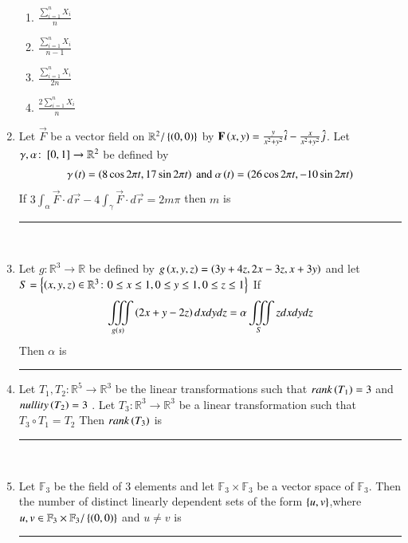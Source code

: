 \documentclass[journal,12pt,onecolumn]{IEEEtran}
\theoremstyle{remark}
\begin{document}
\begin{enumerate}
\begin{multicols}{2}
\begin{enumerate}
           \item $\frac{\sum_{i=1}^{n} X_i}{n}$\\
            \item $\frac{\sum_{i=1}^{n} X_i}{n-1}$
             \item $\frac{\sum_{i=1}^{n} X_i}{2n}$\\
              \item $\frac{2\sum_{i=1}^{n} X_i}{n}$
       \end{enumerate}
       \end{multicols}
       \item Let $\vec{F}$ be a vector field on $\mathbb{R}^2 / \left\{\left(0,0\right)\right\}$ by $\mathbf{F}\left(x,y\right) = \frac{y}{x^2 + y^2}\hat{i} - \frac{x}{x^2 + y^2}\hat{j}$. Let $\gamma , \alpha \colon {}\left[0,1\right] \rightarrow \mathbb{R}^2$ be defined by 
       \begin{align}
           \gamma \left(t\right) = \left(8 \cos{2 \pi t} , 17\sin{2\pi t}\right) \text{ and } \alpha\left(t\right) = \left(26\cos{2\pi t}, -10\sin{2 \pi t}\right)
       \end{align}
       If $3\int_{\alpha}\vec{F}\cdot d\vec{r} - 4\int_{\gamma}\vec{F}\cdot d\vec{r} = 2m\pi$ then $m$  is \rule{3cm}{0.15mm}\\
       \item Let $g \colon \mathbb{R}^3 \rightarrow \mathbb{R}$ be defined by $g\left(x,y,z\right) = \left(3y + 4z , 2x - 3z , x+ 3y\right)$ and let $S = \left\{\left(x,y,z\right) \in \mathbb{R}^3 \colon 0 \leq x \leq 1 , 0 \leq y \leq 1 , 0 \leq z \leq 1\right\}$ If
       \begin{align}
           \iiint \limits_{g\left(s\right)}\left(2x+y-2z\right)dxdydz = \alpha \iiint\limits_S z dx dy dz
       \end{align}
       Then $\alpha$ is \rule{3cm}{0.15mm}
       \item Let $T_1,T_2 \colon \mathbb{R}^5 \rightarrow \mathbb{R}^3$ be the linear transformations such that $rank\left(T_1\right) = 3$ and $nullity\left(T_2\right) = 3$ . Let $T_3 \colon \mathbb{R}^3 \rightarrow \mathbb{R}^3$ be a linear transformation such that $T_3 \circ T_1 = T_2$ Then $rank\left(T_3\right)$ is \rule{3cm}{0.15mm}\\
       \item Let $\mathbb{F}_3$ be the field of 3 elements and let $\mathbb{F}_3 \times \mathbb{F}_3$ be a vector space of $\mathbb{F}_3$. Then the number of distinct linearly dependent sets of the form $\left\{u,v\right\}$,where $u,v \in \mathbb{F}_3 \times \mathbb{F}_3 / \left\{\left(0,0\right)\right\}$ and $ u \neq v$ is \rule{3cm}{0.15mm}\\

\end{enumerate}
\end{document}
